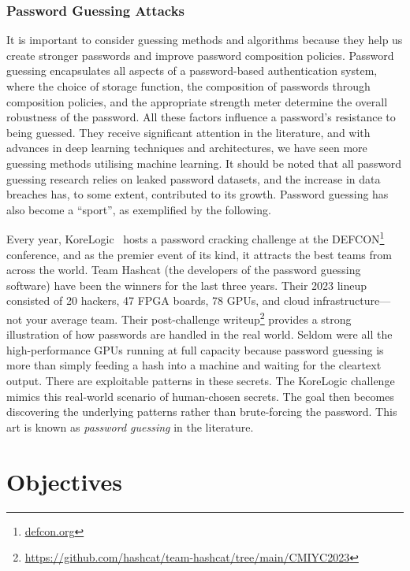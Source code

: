 \subsubsection{Password Guessing Attacks}

It is important to consider guessing methods and algorithms because they help us create stronger passwords and improve password composition policies. Password guessing encapsulates all aspects of a password-based authentication system, where the choice of storage function, the composition of passwords through composition policies, and the appropriate strength meter determine the overall robustness of the password. All these factors influence a password's resistance to being guessed. They receive significant attention in the literature, and with advances in deep learning techniques and architectures, we have seen more guessing methods utilising machine learning. It should be noted that all password guessing research relies on leaked password datasets, and the increase in data breaches has, to some extent, contributed to its growth. Password guessing has also become a ``sport'', as exemplified by the following.

Every year, KoreLogic~\cite{noauthor_korelogic_nodate} hosts a password cracking challenge at the DEFCON\footnote{\href{https://defcon.org}{defcon.org}} conference, and as the premier event of its kind, it attracts the best teams from across the world. Team Hashcat (the developers of the \hashcat password guessing software) have been the winners for the last three years. Their 2023 lineup consisted of 20 hackers, 47 FPGA boards, 78 GPUs, and cloud infrastructure---not your average team. Their post-challenge writeup\footnote{\url{https://github.com/hashcat/team-hashcat/tree/main/CMIYC2023}} provides a strong illustration of how passwords are handled in the real world. Seldom were all the high-performance GPUs running at full capacity because password guessing is more than simply feeding a hash into a machine and waiting for the cleartext output. There are exploitable patterns in these secrets. The KoreLogic challenge mimics this real-world scenario of human-chosen secrets. The goal then becomes discovering the underlying patterns rather than brute-forcing the password. This art is known as \textit{password guessing} in the literature.

\section{Objectives}
\label{sec::chp1::objectives}

